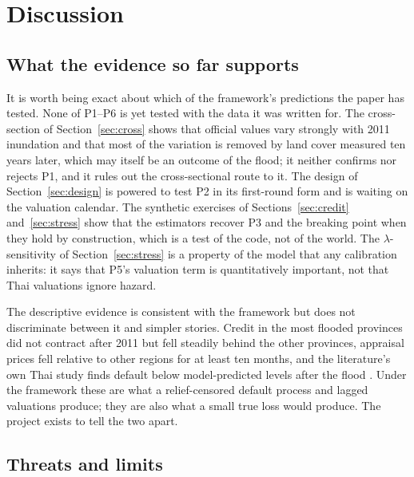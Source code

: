 \section{Discussion}\label{sec:discussion}

\subsection{What the evidence so far supports}

It is worth being exact about which of the framework's predictions the paper has tested. None of P1--P6 is yet tested with the data it was written for. The cross-section of Section~\ref{sec:cross} shows that official values vary strongly with 2011 inundation and that most of the variation is removed by land cover measured ten years later, which may itself be an outcome of the flood; it neither confirms nor rejects P1, and it rules out the cross-sectional route to it. The design of Section~\ref{sec:design} is powered to test P2 in its first-round form and is waiting on the valuation calendar. The synthetic exercises of Sections~\ref{sec:credit} and~\ref{sec:stress} show that the estimators recover P3 and the breaking point when they hold by construction, which is a test of the code, not of the world. The $\lambda$-sensitivity of Section~\ref{sec:stress} is a property of the model that any calibration inherits: it says that P5's valuation term is quantitatively important, not that Thai valuations ignore hazard.

The descriptive evidence is consistent with the framework but does not discriminate between it and simpler stories. Credit in the most flooded provinces did not contract after 2011 but fell steadily behind the other provinces, appraisal prices fell relative to other regions for at least ten months, and the literature's own Thai study finds default below model-predicted levels after the flood \citep{chitchumnong2025physical}. Under the framework these are what a relief-censored default process and lagged valuations produce; they are also what a small true loss would produce. The project exists to tell the two apart.

\subsection{Threats and limits}

